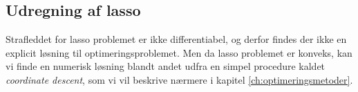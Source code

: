 %
\subsection{Udregning af lasso} \label{subsec:udregning_lasso}
Strafleddet for lasso problemet er ikke differentiabel, og derfor findes der ikke en explicit løsning til optimeringsproblemet.
Men da lasso problemet er konveks, kan vi finde en numerisk løsning blandt andet udfra en simpel procedure kaldet \textit{coordinate descent}, som vi vil beskrive nærmere i kapitel \ref{ch:optimeringsmetoder}.

